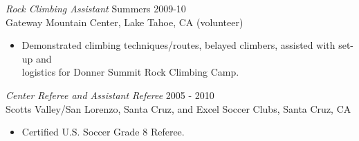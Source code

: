 \documentclass[margin]{res}
\begin{document}
\begin{resume}
\vspace{-6pt}
\textit{Rock Climbing Assistant} \hfill Summers 2009-10
\\Gateway Mountain Center, Lake Tahoe, CA (volunteer)
\begin{itemize}
\item[-] Demonstrated climbing techniques/routes, belayed climbers, assisted with set-up and \\logistics for Donner Summit Rock Climbing Camp.
\end{itemize}

\vspace{-6pt}
\textit{Center Referee and Assistant Referee } \hfill  2005 - 2010
\\Scotts Valley/San Lorenzo, Santa Cruz, and Excel Soccer Clubs, Santa Cruz, CA
\begin{itemize}
\item[-] Certified U.S. Soccer Grade 8 Referee.
\end{itemize}


\end{resume}
\end{document}
